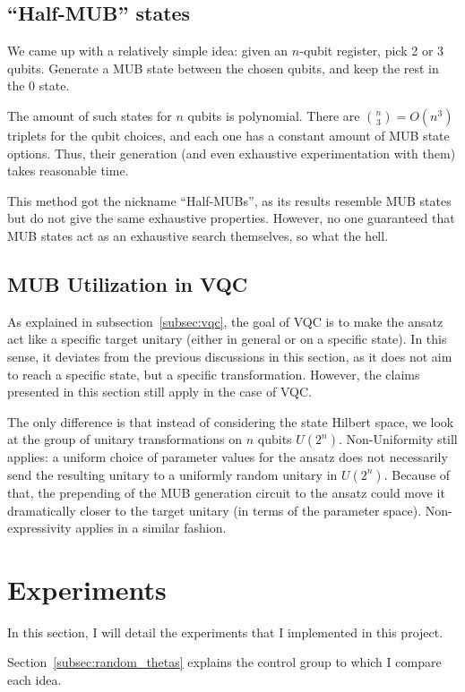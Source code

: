 \documentclass[a4paper,12pt]{article}
\begin{document}
\subsection{``Half-MUB'' states}
We came up with a relatively simple idea: given an $n$-qubit register, pick 2 or 3 qubits. Generate a MUB state between the chosen qubits, and keep the rest in the 0 state.

The amount of such states for $n$ qubits is polynomial. There are ${n \choose 3} = O(n^3)$ triplets for the qubit choices, and each one has a constant amount of MUB state options.
Thus, their generation (and even exhaustive experimentation with them) takes reasonable time.

This method got the nickname ``Half-MUBs'', as its results resemble MUB states but do not give the same exhaustive properties.
However, no one guaranteed that MUB states act as an exhaustive search themselves, so what the hell.

\subsection{MUB Utilization in VQC} \label{subsec:mub_vqc}
As explained in subsection~\ref{subsec:vqc}, the goal of VQC is to make the ansatz act like a specific target unitary (either in general or on a specific state).
In this sense, it deviates from the previous discussions in this section, as it does not aim to reach a specific state, but a specific transformation.
However, the claims presented in this section still apply in the case of VQC.

The only difference is that instead of considering the state Hilbert space, we look at the group of unitary transformations on $n$ qubits $U(2^n)$.
Non-Uniformity still applies: a uniform choice of parameter values for the ansatz does not necessarily send the resulting unitary to a uniformly random unitary in $U(2^n)$.
Because of that, the prepending of the MUB generation circuit to the ansatz could move it dramatically closer to the target unitary (in terms of the parameter space).
Non-expressivity applies in a similar fashion.

\section{Experiments}
In this section, I will detail the experiments that I implemented in this project.

Section~\ref{subsec:random_thetas} explains the control group to which I compare each idea.
\end{document}
